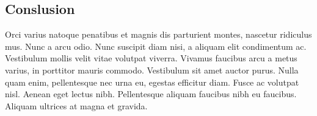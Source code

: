 \documentclass[11pt]{article}
\begin{document}
\begin{multicols*}{2}
\section{Conslusion} \label{finance}
Orci varius natoque penatibus et magnis dis parturient montes, nascetur ridiculus mus. Nunc a arcu odio. Nunc suscipit diam nisi, a aliquam elit condimentum ac. Vestibulum mollis velit vitae volutpat viverra. Vivamus faucibus arcu a metus varius, in porttitor mauris commodo. Vestibulum sit amet auctor purus. Nulla quam enim, pellentesque nec urna eu, egestas efficitur diam. Fusce ac volutpat nisl. Aenean eget lectus nibh. Pellentesque aliquam faucibus nibh eu faucibus. Aliquam ultrices at magna et gravida.

\end{multicols*}
\end{document}
